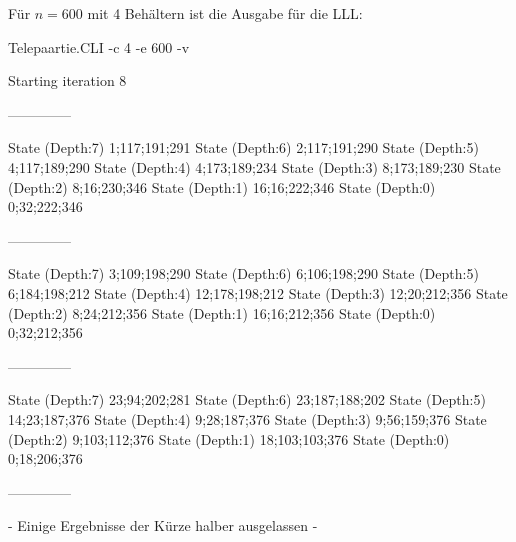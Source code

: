 \documentclass[a4paper,10pt,ngerman]{scrartcl}
\begin{document}
Für \(n = 600\) mit 4 Behältern ist die Ausgabe für die LLL:
\begin{lstcs}
Telepaartie.CLI -c 4 -e 600 -v

Starting iteration 8

--------------

State (Depth:7) {1;117;191;291}
State (Depth:6) {2;117;191;290}
State (Depth:5) {4;117;189;290}
State (Depth:4) {4;173;189;234}
State (Depth:3) {8;173;189;230}
State (Depth:2) {8;16;230;346}
State (Depth:1) {16;16;222;346}
State (Depth:0) {0;32;222;346}

--------------

State (Depth:7) {3;109;198;290}
State (Depth:6) {6;106;198;290}
State (Depth:5) {6;184;198;212}
State (Depth:4) {12;178;198;212}
State (Depth:3) {12;20;212;356}
State (Depth:2) {8;24;212;356}
State (Depth:1) {16;16;212;356}
State (Depth:0) {0;32;212;356}

--------------

State (Depth:7) {23;94;202;281}
State (Depth:6) {23;187;188;202}
State (Depth:5) {14;23;187;376}
State (Depth:4) {9;28;187;376}
State (Depth:3) {9;56;159;376}
State (Depth:2) {9;103;112;376}
State (Depth:1) {18;103;103;376}
State (Depth:0) {0;18;206;376}

--------------
\end{lstcs}

- Einige Ergebnisse der Kürze halber ausgelassen -






\end{document}
